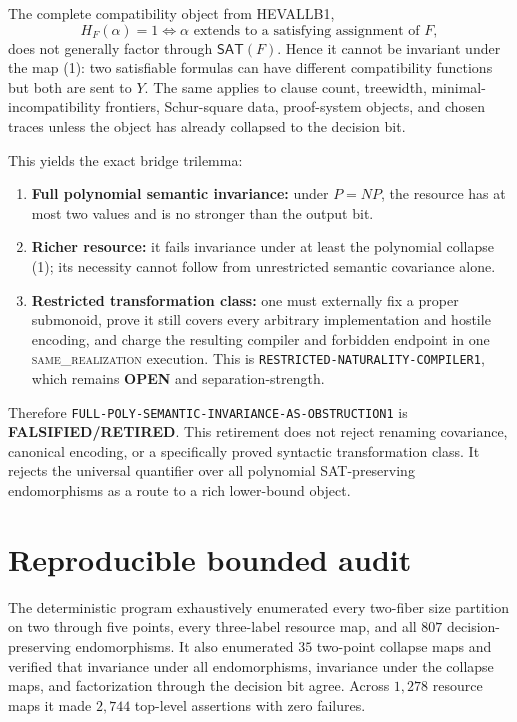 \documentclass[11pt]{article}
\newcommand{\SAT}{\mathsf{SAT}}
\newcommand{\OPEN}{\textbf{OPEN}}
\newcommand{\RETIRED}{\textbf{FALSIFIED/RETIRED}}
\newcommand{\same}{\textsc{same\_realization}}
\begin{document}
The complete compatibility object from HEVALLB1,
\[
 H_F(\alpha)=1\iff \alpha\text{ extends to a satisfying assignment of }F,
\]
does not generally factor through $\SAT(F)$.  Hence it cannot be invariant
under the map (1): two satisfiable formulas can have different compatibility
functions but both are sent to $Y$.  The same applies to clause count,
treewidth, minimal-incompatibility frontiers, Schur-square data, proof-system
objects, and chosen traces unless the object has already collapsed to the
decision bit.

This yields the exact bridge trilemma:
\begin{enumerate}[leftmargin=1.7em]
\item \textbf{Full polynomial semantic invariance:} under $P=NP$, the resource
has at most two values and is no stronger than the output bit.
\item \textbf{Richer resource:} it fails invariance under at least the
polynomial collapse (1); its necessity cannot follow from unrestricted
semantic covariance alone.
\item \textbf{Restricted transformation class:} one must externally fix a
proper submonoid, prove it still covers every arbitrary implementation and
hostile encoding, and charge the resulting compiler and forbidden endpoint in
one \same{} execution.  This is \texttt{RESTRICTED-NATURALITY-COMPILER1},
which remains \OPEN{} and separation-strength.
\end{enumerate}

Therefore \texttt{FULL-POLY-SEMANTIC-INVARIANCE-AS-OBSTRUCTION1} is
\RETIRED.  This retirement does not reject renaming covariance, canonical
encoding, or a specifically proved syntactic transformation class.  It
rejects the universal quantifier over all polynomial SAT-preserving
endomorphisms as a route to a rich lower-bound object.

\section{Reproducible bounded audit}

The deterministic program
 exhaustively
enumerated every two-fiber size partition on two through five points, every
three-label resource map, and all $807$ decision-preserving endomorphisms.
It also enumerated $35$ two-point collapse maps and verified that invariance
under all endomorphisms, invariance under the collapse maps, and factorization
through the decision bit agree.  Across $1{,}278$ resource maps it made
$2{,}744$ top-level assertions with zero failures.
\end{document}
